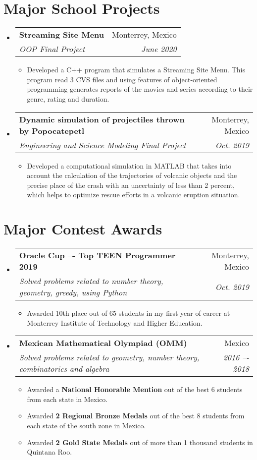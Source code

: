 \documentclass[letterpaper,11pt]{article}
\makeatletter
\newcommand{\resumeItem}[1]{
  \item\small{
    {#1 \vspace{-2pt}}
  }
}
\newcommand{\resumeSubheading}[4]{
  \vspace{-2pt}\item
    \begin{tabular*}{0.97\textwidth}[t]{l@{\extracolsep{\fill}}r}
      \textbf{#1} & #2 \\
      \textit{\small#3} & \textit{\small #4} \\
    \end{tabular*}\vspace{-7pt}
}
\newcommand{\resumeSubHeadingListStart}{\begin{itemize}[leftmargin=0.15in, label={}]}
\newcommand{\resumeSubHeadingListEnd}{\end{itemize}}
\newcommand{\resumeItemListStart}{\begin{itemize}}
\newcommand{\resumeItemListEnd}{\end{itemize}\vspace{-5pt}}
\makeatother
\begin{document}
\section{Major School Projects}
\resumeSubHeadingListStart
    \resumeSubheading
      {Streaming Site Menu}{Monterrey, Mexico}
      {OOP Final Project}{June 2020}
      \resumeItemListStart
        \resumeItem{Developed a C++ program that simulates a Streaming Site Menu. This program read 3 CVS files and using features of object-oriented programming generates reports of the movies and series according to their genre, rating and duration.}
      \resumeItemListEnd
      \resumeSubheading
      {Dynamic simulation of projectiles thrown by Popocatepetl}{Monterrey, Mexico}
      {Engineering and Science Modeling Final Project}{Oct. 2019}
      \resumeItemListStart
        \resumeItem{Developed a computational simulation in MATLAB that takes into account the calculation of the trajectories of volcanic objects and the precise place of the crash with an uncertainty of less than 2 percent, which helps to optimize rescue efforts in a volcanic eruption situation.
}
      \resumeItemListEnd
    \resumeSubHeadingListEnd

\section{Major Contest Awards}
\resumeSubHeadingListStart
    \resumeSubheading
      {Oracle Cup –- Top TEEN Programmer 2019}{Monterrey, Mexico}
      {Solved problems related to number theory, geometry, greedy, using Python}{Oct. 2019}
      \resumeItemListStart
        \resumeItem {Awarded 10th place out of 65 students in my first year of career at Monterrey Institute of Technology and Higher Education.}
      \resumeItemListEnd
      \resumeSubheading
      {Mexican Mathematical Olympiad (OMM)}{Mexico}
      {Solved problems related to geometry, number theory, combinatorics and algebra}{2016 –- 2018}
      \resumeItemListStart
        \resumeItem{Awarded a \textbf{National Honorable Mention} out of the best 6 students from each state in Mexico.}
        \resumeItem{Awarded \textbf{2 Regional Bronze Medals} out of the best 8 students from each state of the south zone in Mexico.}
        \resumeItem{Awarded \textbf{2 Gold State Medals} out of more than 1 thousand students in Quintana Roo.}
      \resumeItemListEnd
    \resumeSubHeadingListEnd

\end{document}
